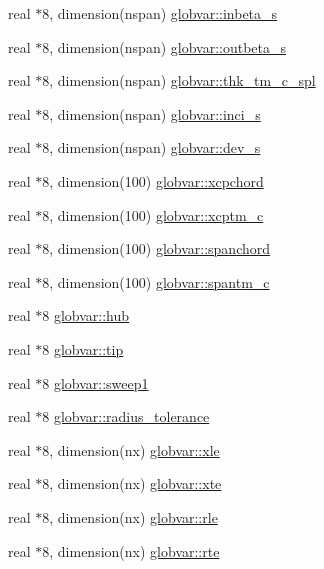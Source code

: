 \begin{DoxyCompactItemize}
\item 
real $\ast$8, dimension(nspan) \hyperlink{namespaceglobvar_ac564ea1048d771da8ef902ab237e6cd4}{globvar\+::inbeta\+\_\+s}
\item 
real $\ast$8, dimension(nspan) \hyperlink{namespaceglobvar_a7c178a712e3c274e2a3496efbea3f9e7}{globvar\+::outbeta\+\_\+s}
\item 
real $\ast$8, dimension(nspan) \hyperlink{namespaceglobvar_ae980d61bc1b36665a6e34c2550f78542}{globvar\+::thk\+\_\+tm\+\_\+c\+\_\+spl}
\item 
real $\ast$8, dimension(nspan) \hyperlink{namespaceglobvar_abe8aad5ab0f38bb4ec7e960415ced26a}{globvar\+::inci\+\_\+s}
\item 
real $\ast$8, dimension(nspan) \hyperlink{namespaceglobvar_a03bd2d274fd38f87435439d86e0f92c2}{globvar\+::dev\+\_\+s}
\item 
real $\ast$8, dimension(100) \hyperlink{namespaceglobvar_a7d3222448b640704a89fa6cdc07a4331}{globvar\+::xcpchord}
\item 
real $\ast$8, dimension(100) \hyperlink{namespaceglobvar_a8553c7b87c906988c811df4d4b810bbf}{globvar\+::xcptm\+\_\+c}
\item 
real $\ast$8, dimension(100) \hyperlink{namespaceglobvar_ad2c20e4194dda60c8e4a46ad62a24099}{globvar\+::spanchord}
\item 
real $\ast$8, dimension(100) \hyperlink{namespaceglobvar_ad0a1491128c64a390fc1925c63c43a9a}{globvar\+::spantm\+\_\+c}
\item 
real $\ast$8 \hyperlink{namespaceglobvar_afe5a2fb0a1ae94505f2ade324addffd6}{globvar\+::hub}
\item 
real $\ast$8 \hyperlink{namespaceglobvar_ae899a4ed69eab45967a2e360c288f62f}{globvar\+::tip}
\item 
real $\ast$8 \hyperlink{namespaceglobvar_a2d93dde71ed9b4b71b5640624a2dba82}{globvar\+::sweep1}
\item 
real $\ast$8 \hyperlink{namespaceglobvar_ab9d0a77e6b65126e97f664a07018fbd9}{globvar\+::radius\+\_\+tolerance}
\item 
real $\ast$8, dimension(nx) \hyperlink{namespaceglobvar_acf2d15a74c6397bfde89f463fd847958}{globvar\+::xle}
\item 
real $\ast$8, dimension(nx) \hyperlink{namespaceglobvar_a8f63012c2466eb1bb44ecf69fbec3f8c}{globvar\+::xte}
\item 
real $\ast$8, dimension(nx) \hyperlink{namespaceglobvar_ad03d6f3d23b278acc643ea493cf17fa5}{globvar\+::rle}
\item 
real $\ast$8, dimension(nx) \hyperlink{namespaceglobvar_a25e9da91b03e68d6849d46ceaa05ffb3}{globvar\+::rte}

\end{DoxyCompactItemize}
